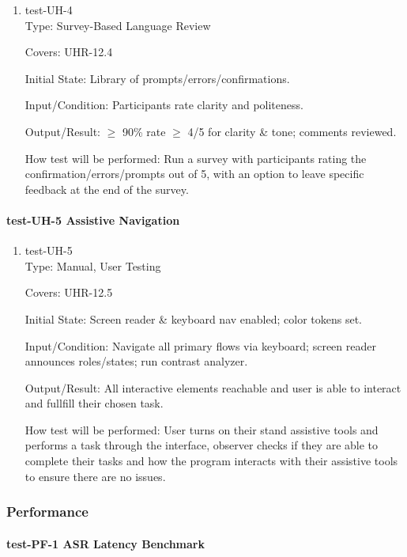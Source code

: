 \documentclass[12pt, titlepage]{article}
\begin{document}
\begin{enumerate}
\item{test-UH-4\\}
Type: Survey-Based Language Review

Covers: UHR-12.4

Initial State: Library of prompts/errors/confirmations.

Input/Condition: Participants rate clarity and politeness.

Output/Result: $\geq$ 90\% rate $\geq$ 4/5 for clarity \& tone; comments reviewed.

How test will be performed: Run a survey with participants rating the confirmation/errors/prompts out of 5, with an option to leave specific feedback at the end of the survey.
\end{enumerate}

\paragraph{test-UH-5 Assistive Navigation}

\begin{enumerate}
\item{test-UH-5\\}
Type: Manual, User Testing

Covers: UHR-12.5

Initial State: Screen reader \& keyboard nav enabled; color tokens set.

Input/Condition: Navigate all primary flows via keyboard; screen reader announces roles/states; run contrast analyzer.

Output/Result: All interactive elements reachable and user is able to interact and fullfill their chosen task.

How test will be performed: User turns on their stand assistive tools and performs a task through the interface, observer checks if they are able to complete their tasks and how the program interacts with their assistive tools to ensure there are no issues.
\end{enumerate}

\subsubsection{Performance}

\paragraph{test-PF-1 ASR Latency Benchmark}
\end{document}
